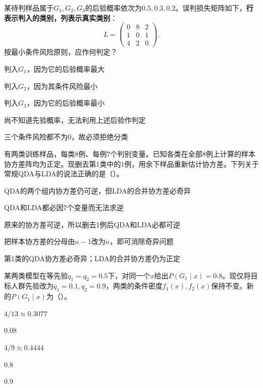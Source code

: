 \par\noindent\begin{minipage}{\linewidth}
某待判样品属于$G_1,G_2,G_3$的后验概率依次为$0.5,0.3,0.2$。误判损失矩阵如下，\textbf{行表示判入的类别，列表示真实类别}：
\[
L=\begin{pmatrix}0&8&2\\1&0&1\\4&2&0\end{pmatrix}.
\]
按最小条件风险原则，应作何判定？
\begin{choices}
\item 判入$G_1$，因为它的后验概率最大
\item 判入$G_2$，因为其条件风险最小
\item 判入$G_3$，因为它的后验概率最小
\item 尚不知道先验概率，无法利用上述后验作判定
\item 三个条件风险都不为0，故必须拒绝分类
\end{choices}
\end{minipage}\par\medskip

\par\noindent\begin{minipage}{\linewidth}
有两类训练样品，每类8例、每例7个判别变量。已知各类在全部8例上计算的样本协方差阵均为正定。现删去第1类中的1例，用余下样品重新估计协方差。下列关于常规QDA与LDA的说法正确的是（\quad）。
\begin{choices}
\item QDA的两个组内协方差仍可逆，但LDA的合并协方差必奇异
\item QDA和LDA都必因7个变量而无法求逆
\item 原来的协方差可逆，所以删去1例后QDA和LDA必都可逆
\item 把样本协方差的分母由$n-1$改为$n$，即可消除奇异问题
\item 第1类的QDA协方差必奇异；LDA的合并协方差仍为正定
\end{choices}
\end{minipage}\par\medskip

\par\noindent\begin{minipage}{\linewidth}
某两类模型在等先验$q_1=q_2=0.5$下，对同一个$x$给出$P(G_1\mid x)=0.8$。现仅将目标人群先验改为$q_1=0.1,q_2=0.9$，两类的条件密度$f_1(x),f_2(x)$保持不变。新的$P(G_1\mid x)$为（\quad）。
\begin{choices}
\item $4/13\approx0.3077$
\item $0.08$
\item $4/9\approx0.4444$
\item $0.8$
\item $0.9$
\end{choices}
\end{minipage}\par\medskip


